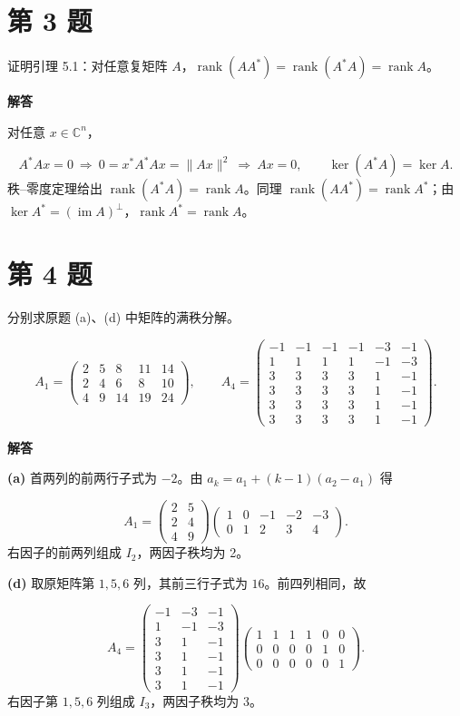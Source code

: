 \documentclass[UTF8,10pt,letterpaper,fontset=fandol]{ctexart}
\newcommand{\C}{\mathbb C}
\DeclareMathOperator{\rank}{rank}
\DeclareMathOperator{\im}{im}
\begin{document}
\section{第 3 题}
证明引理 5.1：对任意复矩阵 $A$，$\rank(AA^*)=\rank(A^*A)=\rank A$。\par
\par{}\textbf{解答}\par
对任意 $x\in\C^n$，\par
\[
 A^*Ax=0\ \Longrightarrow\ 0=x^*A^*Ax=\|Ax\|^2
 \ \Longrightarrow\ Ax=0,\qquad \ker(A^*A)=\ker A.
\]
秩–零度定理给出 $\rank(A^*A)=\rank A$。同理 $\rank(AA^*)=\rank A^*$；由 $\ker A^*=(\im A)^\perp$，$\rank A^*=\rank A$。\par
\section{第 4 题}
分别求原题 (a)、(d) 中矩阵的满秩分解。\par
\[
 A_1=\begin{pmatrix}2&5&8&11&14\\2&4&6&8&10\\4&9&14&19&24\end{pmatrix},\qquad
 A_4=\begin{pmatrix}-1&-1&-1&-1&-3&-1\\1&1&1&1&-1&-3\\3&3&3&3&1&-1\\3&3&3&3&1&-1\\3&3&3&3&1&-1\\3&3&3&3&1&-1\end{pmatrix}.
\]
\par{}\textbf{解答}\par
\textbf{(a)} 首两列的前两行子式为 $-2$。由 $a_k=a_1+(k-1)(a_2-a_1)$ 得\par
\[
 \boxed{A_1=\begin{pmatrix}2&5\\2&4\\4&9\end{pmatrix}
 \begin{pmatrix}1&0&-1&-2&-3\\0&1&2&3&4\end{pmatrix}} .
\]
右因子的前两列组成 $I_2$，两因子秩均为 2。\par
\textbf{(d)} 取原矩阵第 $1,5,6$ 列，其前三行子式为 $16$。前四列相同，故\par
\[
 \boxed{A_4=
 \begin{pmatrix}-1&-3&-1\\1&-1&-3\\3&1&-1\\3&1&-1\\3&1&-1\\3&1&-1\end{pmatrix}
 \begin{pmatrix}1&1&1&1&0&0\\0&0&0&0&1&0\\0&0&0&0&0&1\end{pmatrix}} .
\]
右因子第 $1,5,6$ 列组成 $I_3$，两因子秩均为 3。\par
\end{document}
